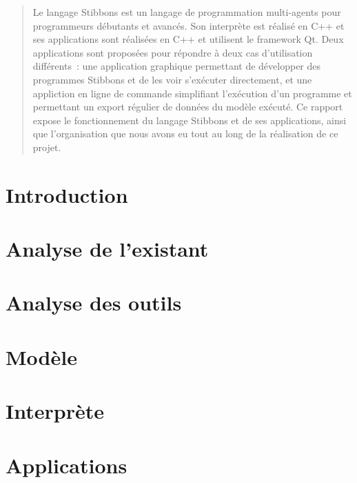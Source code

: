 \documentclass[a4paper,11pt]{report}
\newcommand{\+}{\discretionary{\mbox{\scriptsize$\hookleftarrow$}}{}{}}
\begin{document}
\begin{abstract}
Le langage Stibbons est un langage de programmation multi-agents pour programmeurs débutants et avancés. Son interprète est réalisé en C++ et ses applications sont réalisées en C++ et utilisent le framework Qt.
Deux applications sont proposées pour répondre à deux cas d'utilisation différents~: une application graphique permettant de développer des programmes Stibbons et de les voir s'exécuter directement, et une appliction en ligne de commande simplifiant l'exécution d'un programme et permettant un export régulier de données du modèle exécuté.
Ce rapport expose le fonctionnement du langage Stibbons et de ses applications, ainsi que l'organisation que nous avons eu tout au long de la réalisation de ce projet.
\end{abstract}

\chapter{Introduction}


\chapter{Analyse de l'existant}




\chapter{Analyse des outils}








\chapter{Modèle}


\chapter{Interprète}


\chapter{Applications}

\end{document}
